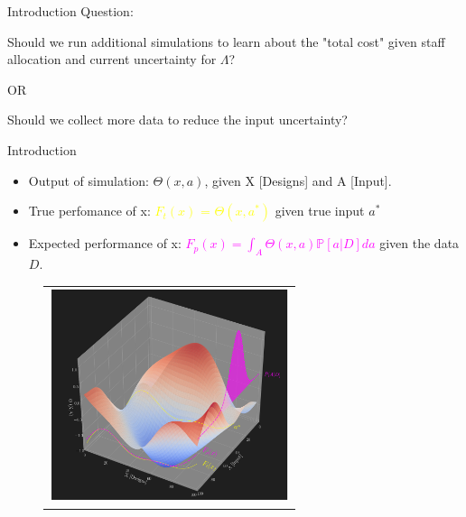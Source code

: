 \documentclass{beamer}
\begin{document}
\begin{frame}{Introduction}
Question:
\begin{center}
	Should we run additional simulations to learn about the "total cost" given staff allocation and current uncertainty for $\Lambda$?
\end{center}
\begin{center}
	OR
\end{center}
\begin{center}
	Should we collect more data to reduce the input uncertainty?
\end{center}
\end{frame}

\begin{frame}{Introduction}

\begin{itemize}
	\item \small{Output of simulation: $\Theta (x,a)$, given X [Designs] and A [Input].}
	\item \small{True perfomance of x: \textcolor{yellow}{$F_{t}(x)$ = $\Theta (x, a^{*})$} given true input  $a^{*}$}
	\item \small{Expected performance of x: \textcolor{magenta}{$F_{p}(x) = \int_{A}\Theta(x,a)\mathbb{P}[a|D]da$} given the data $D$.}
\end{itemize}
	
\begin{figure}
	\centering
	\begin{tabular}{c}
		\includegraphics[width=7.0cm]{INTRO_IMAGE.png}\\
	\end{tabular}
\end{figure}
\end{frame}
\end{document}
